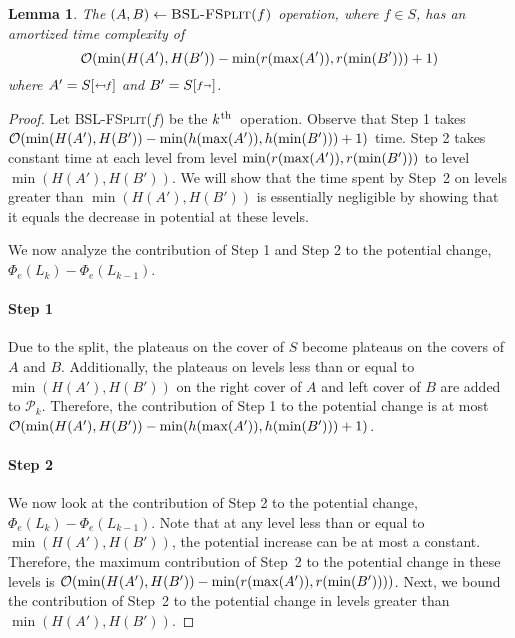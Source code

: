 \documentclass[11pt]{article}
\newcommand{\ens}[1]{\ensuremath{#1}}
\newcommand{\kth}{\ens{k^{ \mbox{\hspace{.2mm}\scriptsize th}}}}
\newcommand{\Bslfsplx}[1]{\mbox{\textsc{BSL-FSplit(\ensuremath{#1})}}}
\newcommand{\nodeheight}[1]{\ensuremath{h(#1)}}
\newcommand{\intheight}[1]{\ensuremath{H(#1)}}
\newcommand{\intmax}[1]{\ensuremath{\max(\intl #1)}}
\newcommand{\intmin}[1]{\ensuremath{\min(\intl #1)}}
\newcommand{\intl}[1]{\ensuremath{#1}}
\newcommand{\beforeop}[1]{\ensuremath{#1'}}
\newcommand{\noderank}[1]{\ensuremath{r(\node #1)}}
\newcommand{\node}[1]{\ensuremath{#1}}
\newcommand{\prebsltempl}[4]{\ensuremath{#1{[\raisebox{#4}{$#3\mapsfrom\hspace{-0.0mm}#2$}]}}}
\newcommand{\prebsl}[2]{\ensuremath{\prebsltempl{#1}{#2}{\scriptstyle}{0.3mm}}}
\newcommand{\postbsltempl}[4]{\ensuremath{#1{[\raisebox{#4}{$#3#2\shortrightarrow\hspace{-0.0mm}$}]}}}
\newcommand{\postbsl}[2]{\ensuremath{\postbsltempl{#1}{#2}{\scriptstyle}{0.3mm}}}
\newcommand{\bsl}[1]{\ensuremath{#1}}
\newcommand{\indatast}[1]{\ensuremath{L_{#1}}}
\newcommand{\locpotfun}[1]{\ensuremath{\Phi_{e}(#1)}}
\newcommand{\plats}[1]{\ensuremath{\mathcal P_{#1}}}
\newcounter{count}
\newtheorem{lemma}[count]{Lemma}
\begin{document}
\begin{lemma} 
\label{lem:costofbslfsplit} 
The $(\bsl A, \bsl B) \leftarrow \Bslfsplx{f}$ operation, where $\node f\in \bsl S$, has an amortized time complexity of 
\[ {\cal O}(\min(\intheight{\beforeop{A}},\intheight{\beforeop{B}}) - \min(\noderank{\intmax{\beforeop{A}}}, \noderank{\intmin{\beforeop{B}}})+1)\] 
where $\beforeop{A} = \prebsl{S}{f}$ and $\beforeop{B}=\postbsl{S}{f}$. 
\end{lemma} 


\begin{proof} 
Let \Bslfsplx{f} be the \kth\ operation. Observe that Step 1 takes $\mathcal O(\min(\intheight{\beforeop{A}},\intheight{\beforeop{B}}) - \min(\nodeheight{\intmax{\beforeop{A}}}, \nodeheight{\intmin{\beforeop{B}}})+1)$ time. 
Step 2 takes constant time at each level from level $\min(\noderank{\intmax{\beforeop{A}}}, \noderank{\intmin{\beforeop{B}}})$ to level $\min(\intheight{\beforeop{A}},\intheight{\beforeop{B}})$. We will show that the time spent by Step~2 on levels greater than $\min(\intheight{\beforeop{A}},\intheight{\beforeop{B}})$ is essentially negligible by showing that it equals the decrease in potential at these levels. 

We now analyze the contribution of Step 1 and Step 2 to the potential change, $\locpotfun{\indatast k} - \locpotfun{\indatast{k-1}}$. 

\paragraph{Step 1} 


Due to the split, the plateaus on the cover of \bsl S become plateaus on the covers of \bsl A and \bsl B. Additionally, the plateaus on levels less than or equal to $\min(\intheight{\beforeop{A}}, \intheight{\beforeop{B}})$ on the right cover of \bsl A and left cover of \bsl B are added to \plats k. 
Therefore, the contribution of Step 1 to the potential change is at most $\mathcal O(\min(\intheight{\beforeop{A}},\intheight{\beforeop{B}}) - \min(\nodeheight{\intmax{\beforeop{A}}},\nodeheight{\intmin{\beforeop{B}}})+1)$. 

\paragraph{Step 2} 
We now look at the contribution of Step 2 to the potential change, $\locpotfun{\indatast k} - \locpotfun{\indatast{k-1}}$. Note that at any level less than or equal to $\min(\intheight{\beforeop{A}}, \intheight{\beforeop{B}})$, the potential increase can be at most a constant. Therefore, the maximum contribution of Step~2 to the potential change in these levels is $\mathcal O(\min(\intheight{\beforeop{A}}, \intheight{\beforeop{B}}) - \min(\noderank{\intmax{\beforeop{A}}},\noderank{\intmin{\beforeop{B}}}))$. Next, we bound the contribution of Step~2 to the potential change in levels greater than $\min(\intheight{\beforeop{A}}, \intheight{\beforeop{B}})$. 


\end{proof}
\end{document}
